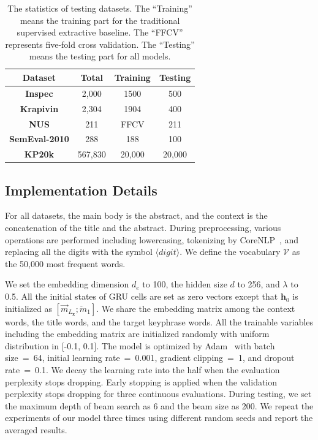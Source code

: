 \documentclass[letterpaper]{article} %
\begin{document}
\begin{table}[h]
\centering
\begin{tabular}{ c c c c}
\hline
\hline
 Dataset & Total & Training & Testing\\
\hline
\textbf{Inspec} & 2,000 & 1500 & 500\\
\hline
\textbf{Krapivin} & 2,304 & 1904 & 400\\
\hline
\textbf{NUS} & 211 & FFCV & 211\\
\hline
\textbf{SemEval-2010} & 288 & 188 & 100\\
\hline
\textbf{KP20k} & 567,830 & 20,000 & 20,000\\
\hline
\end{tabular}
\caption{The statistics of testing datasets. The ``Training'' means the training part for the traditional supervised extractive baseline. The ``FFCV'' represents five-fold cross validation. The ``Testing'' means the testing part for all models.}
\label{table:statistic_testset}
\end{table}


\subsection{Implementation Details}
For all datasets, the main body is the abstract, and the context is the concatenation of the title and the abstract. During preprocessing, various operations are performed including lowercasing, tokenizing by CoreNLP~\cite{manning2014stanford}, and replacing all the digits with the symbol $\langle digit \rangle$. We define the vocabulary $\mathcal{V}$ as the 50,000 most frequent words. 

We set the embedding dimension $d_e$ to 100, the hidden size $d$ to 256, and $\lambda$ to  0.5. All the initial states of GRU cells are set as zero vectors except that $\mathbf{h}_0$ is initialized as $[\overrightarrow{m}_{L_{\mathbf{x}}}; \overleftarrow{m}_1]$. We share the embedding matrix among the context words, the title words, and the target keyphrase words. All the trainable variables including the embedding matrix are initialized randomly with uniform distribution in [-0.1, 0.1]. The model is optimized by Adam~\cite{kingma2014adam} with batch size~=~64, initial learning rate~=~0.001, gradient clipping~=~1, and dropout rate~=~0.1. We decay the learning rate into the half when the evaluation perplexity stops dropping. Early stopping is applied when the validation perplexity stops dropping for three continuous evaluations. During testing, we set the maximum depth of beam search as 6 and the beam size as 200. We repeat the experiments of our model three times using different random seeds and report the averaged results.
\end{document}

